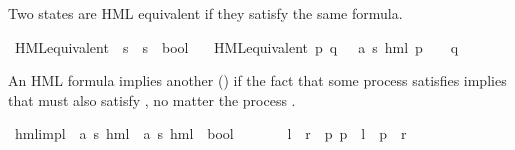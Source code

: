 \begin{isabellebody}
\endisatagproof
{\isafoldproof}%
%
\isadelimproof
%
\endisadelimproof
%
\begin{isamarkuptext}%
Two states are HML equivalent if they satisfy the same formula.%
\end{isamarkuptext}\isamarkuptrue%
\isamarkupfalse%
\ HML{\isacharunderscore}{\kern0pt}equivalent\ {\isacharcolon}{\kern0pt}{\isacharcolon}{\kern0pt}\ {\isacartoucheopen}{\isacharprime}{\kern0pt}s\ {\isasymRightarrow}\ {\isacharprime}{\kern0pt}s\ {\isasymRightarrow}\ bool{\isacartoucheclose}\ \isanewline
\ \ {\isacartoucheopen}HML{\isacharunderscore}{\kern0pt}equivalent\ p\ q\ {\isasymequiv}\ {\isacharparenleft}{\kern0pt}{\isasymforall}\ {\isasymphi}{\isacharcolon}{\kern0pt}{\isacharcolon}{\kern0pt}{\isacharparenleft}{\kern0pt}{\isacharprime}{\kern0pt}a{\isacharcomma}{\kern0pt}\ {\isacharprime}{\kern0pt}s{\isacharparenright}{\kern0pt}\ hml{\isachardot}{\kern0pt}\ {\isacharparenleft}{\kern0pt}p\ {\isasymTurnstile}\ {\isasymphi}{\isacharparenright}{\kern0pt}\ {\isasymlongleftrightarrow}\ {\isacharparenleft}{\kern0pt}q\ {\isasymTurnstile}\ {\isasymphi}{\isacharparenright}{\kern0pt}{\isacharparenright}{\kern0pt}{\isacartoucheclose}%
\begin{isamarkuptext}%
An HML formula  implies another () if the fact that some process  satisfies 
implies that  must also satisfy , no matter the process .%
\end{isamarkuptext}\isamarkuptrue%
\isamarkupfalse%
\ hml{\isacharunderscore}{\kern0pt}impl\ {\isacharcolon}{\kern0pt}{\isacharcolon}{\kern0pt}\ {\isachardoublequoteopen}{\isacharparenleft}{\kern0pt}{\isacharprime}{\kern0pt}a{\isacharcomma}{\kern0pt}\ {\isacharprime}{\kern0pt}s{\isacharparenright}{\kern0pt}\ hml\ {\isasymRightarrow}\ {\isacharparenleft}{\kern0pt}{\isacharprime}{\kern0pt}a{\isacharcomma}{\kern0pt}\ {\isacharprime}{\kern0pt}s{\isacharparenright}{\kern0pt}\ hml\ {\isasymRightarrow}\ bool{\isachardoublequoteclose}\ {\isacharparenleft}{\kern0pt}\ {\isachardoublequoteopen}{\isasymRrightarrow}{\isachardoublequoteclose}\ {}{}{\isacharparenright}{\kern0pt}\ \ \isanewline
\ \ {\isachardoublequoteopen}{\isasymphi}l\ {\isasymRrightarrow}\ {\isasymphi}r\ {\isasymequiv}\ {\isacharparenleft}{\kern0pt}{\isasymforall}p{\isachardot}{\kern0pt}\ {\isacharparenleft}{\kern0pt}p\ {\isasymTurnstile}\ {\isasymphi}l{\isacharparenright}{\kern0pt}\ {\isasymlongrightarrow}\ {\isacharparenleft}{\kern0pt}p\ {\isasymTurnstile}\ {\isasymphi}r{\isacharparenright}{\kern0pt}{\isacharparenright}{\kern0pt}{\isachardoublequoteclose}\isanewline

\end{isabellebody}
